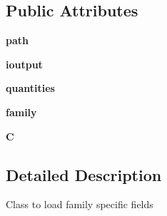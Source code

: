 \subsection*{Public Attributes}
\begin{DoxyCompactItemize}
\item 
\hypertarget{classseren3_1_1core_1_1snapshot_1_1Family_a2588016bb7719a9e8d1887e16b3179a3}{
{\bfseries path}}
\label{classseren3_1_1core_1_1snapshot_1_1Family_a2588016bb7719a9e8d1887e16b3179a3}

\item 
\hypertarget{classseren3_1_1core_1_1snapshot_1_1Family_a3319fcd1b08cad8951c901f0b88238bc}{
{\bfseries ioutput}}
\label{classseren3_1_1core_1_1snapshot_1_1Family_a3319fcd1b08cad8951c901f0b88238bc}

\item 
\hypertarget{classseren3_1_1core_1_1snapshot_1_1Family_aa2b263e33f2dc51fdf310510193738a5}{
{\bfseries quantities}}
\label{classseren3_1_1core_1_1snapshot_1_1Family_aa2b263e33f2dc51fdf310510193738a5}

\item 
\hypertarget{classseren3_1_1core_1_1snapshot_1_1Family_a8597137b229ed9689fe3e2ecfc9cb65c}{
{\bfseries family}}
\label{classseren3_1_1core_1_1snapshot_1_1Family_a8597137b229ed9689fe3e2ecfc9cb65c}

\item 
\hypertarget{classseren3_1_1core_1_1snapshot_1_1Family_a3437a6b119264851e63803d9df842d16}{
{\bfseries C}}
\label{classseren3_1_1core_1_1snapshot_1_1Family_a3437a6b119264851e63803d9df842d16}

\end{DoxyCompactItemize}


\subsection{Detailed Description}
\begin{DoxyVerb}
Class to load family specific fields
\end{DoxyVerb}
 

